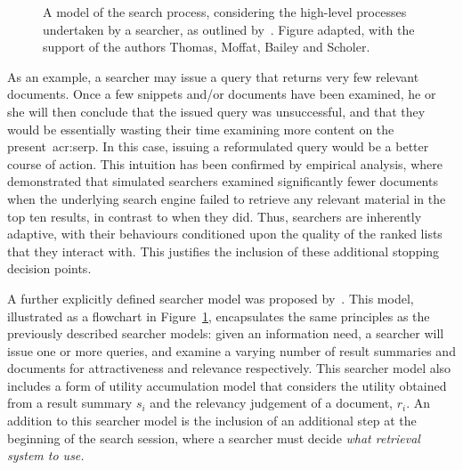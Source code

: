 \begin{figure}[t!]
    \centering
    \caption[Model of the search process by~\cite{thomas2014modelling_behaviour}]{A model of the search process, considering the high-level processes undertaken by a searcher, as outlined by~\cite{thomas2014modelling_behaviour}. Figure adapted, with the support of the authors Thomas, Moffat, Bailey and Scholer.}
    \label{fig:thomas_model}
\end{figure}

As an example, a searcher may issue a query that returns very few relevant documents. Once a few snippets and/or documents have been examined, he or she will then conclude that the issued query was unsuccessful, and that they would be essentially wasting their time examining more content on the present~\gls{acr:serp}. In this case, issuing a reformulated query would be a better course of action. This intuition has been confirmed by empirical analysis, where~\cite{azzopardi2011economics} demonstrated that simulated searchers examined significantly fewer documents when the underlying search engine failed to retrieve any relevant material in the top ten results, in contrast to when they did. Thus, searchers are inherently adaptive, with their behaviours conditioned upon the quality of the ranked lists that they interact with. This justifies the inclusion of these additional stopping decision points.

A further explicitly defined searcher model was proposed by~\cite{thomas2014modelling_behaviour}. This model, illustrated as a flowchart in Figure~\ref{fig:thomas_model}, encapsulates the same principles as the previously described searcher models: given an information need, a searcher will issue one or more queries, and examine a varying number of result summaries and documents for attractiveness and relevance respectively. This searcher model also includes a form of utility accumulation model that considers the utility obtained from a result summary $s_i$ and the relevancy judgement of a document, $r_i$. An addition to this searcher model is the inclusion of an additional step at the beginning of the search session, where a searcher must decide \emph{what retrieval system to use.}

